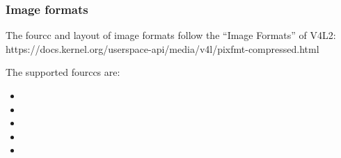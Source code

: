 \subsubsection{Image formats}\label{sec:Device Types / Video Device / Supported formats / Image formats}

The fourcc and layout of image formats follow the ``Image Formats'' of
V4L2:
https://docs.kernel.org/userspace-api/media/v4l/pixfmt-compressed.html

The supported fourccs are:

\begin{itemize}
\item
\item
\item
\item
\item
\end{itemize}
